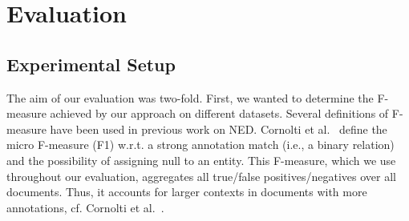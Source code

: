 

\section{Evaluation}
\label{sec:eval}

\subsection{Experimental Setup}
\label{eval}
The aim of our evaluation was two-fold.
First, we wanted  to determine the F-measure achieved by our approach on different datasets.
Several definitions of F-measure have been used in previous work on \ac{NED}.
Cornolti et al.~\cite{cornolti} define the micro F-measure (F1) w.r.t. a strong annotation match (i.e., a binary relation) and the possibility of assigning null to an entity.
This F-measure, which we use throughout our evaluation, aggregates all true/false positives/negatives over all documents.
Thus, it accounts for larger contexts in documents with more annotations, cf. Cornolti et al.~\cite{cornolti}.


